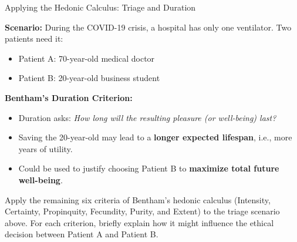 \documentclass[aspectratio=169, 10pt]{beamer}
\begin{document}
\begin{frame}{Applying the Hedonic Calculus: Triage and Duration}

\textbf{Scenario:}  
During the COVID-19 crisis, a hospital has only one ventilator. Two patients need it:
\begin{itemize}
    \item Patient A: 70-year-old medical doctor
    \item Patient B: 20-year-old business student
\end{itemize}

\vspace{.5em}

\textbf{Bentham’s Duration Criterion:}  
\begin{itemize}
    \item Duration asks: \textit{How long will the resulting pleasure (or well-being) last?}
    \item Saving the 20-year-old may lead to a \textbf{longer expected lifespan}, i.e., more years of utility.
    \item Could be used to justify choosing Patient B to \textbf{maximize total future well-being}.
\end{itemize}

\vspace{.5em}

\begin{tcolorbox}[colback=WHUblue!5!white, colframe=WHUblue, title=Homework, fonttitle=\bfseries, sharp corners=south]
Apply the remaining six criteria of Bentham’s hedonic calculus (Intensity, Certainty, Propinquity, Fecundity, Purity, and Extent) to the triage scenario above. For each criterion, briefly explain how it might influence the ethical decision between Patient A and Patient B.
\end{tcolorbox}



\end{frame}
\end{document}
